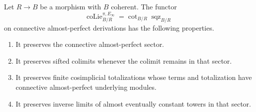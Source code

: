 \begin{lemma}
\label{lem:bnla-spectral-colie-continuity}
Let $R\to B$ be a morphism with $B$ coherent.  The functor
\[
    \operatorname{coLie}^{\pi,E_\infty}_{B/R}
    =\operatorname{cot}_{B/R}\operatorname{sqz}_{B/R}
\]
on connective almost-perfect derivations has the following properties.
\begin{enumerate}
    \item It preserves the connective almost-perfect sector.
    \item It preserves sifted colimits whenever the colimit remains in that
    sector.
    \item It preserves finite cosimplicial totalizations whose terms and
    totalization have connective almost-perfect underlying modules.
    \item It preserves inverse limits of almost eventually constant towers in
    that sector.
\end{enumerate}
\end{lemma}

